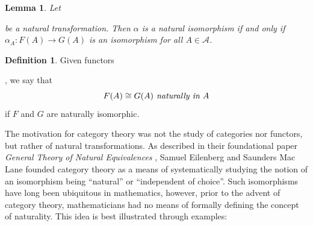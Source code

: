 \documentclass[10pt,oneside]{book}
\def\~#1{\mathscr{#1}}
\theoremstyle{plain}
\newtheorem{lem}[thm]{Lemma}
\theoremstyle{definition}
\newtheorem{defn}[thm]{Definition}
\theoremstyle{remark}
\numberwithin{equation}{section}
\numberwithin{figure}{section}
\begin{document}
\begin{lem}
\label{lem:nat_isom_condition}
    Let  be a natural transformation. Then $\alpha$ is a natural isomorphism if and only if $\alpha_A: F(A) \to G(A)$ is an isomorphism for all $A \in \~A$.
\end{lem}

\begin{defn}
\label{defn:naturally}
    Given functors , we say that
\[F(A) \cong G(A) \emph{ naturally in } A\]
if $F$ and $G$ are naturally isomorphic.
\end{defn}

The motivation for category theory was not the study of categories nor functors, but rather of natural transformations. As described in their foundational paper \emph{General Theory of Natural Equivalences} \cite{eilenberg_maclane}, Samuel Eilenberg and Saunders Mac Lane founded category theory as a means of systematically studying the notion of an isomorphism being ``natural'' or ``independent of choice''. Such isomorphisms have long been ubiquitous in mathematics, however, prior to the advent of category theory, mathematicians had no means of formally defining the concept of naturality. This idea is best illustrated through examples:
\end{document}
